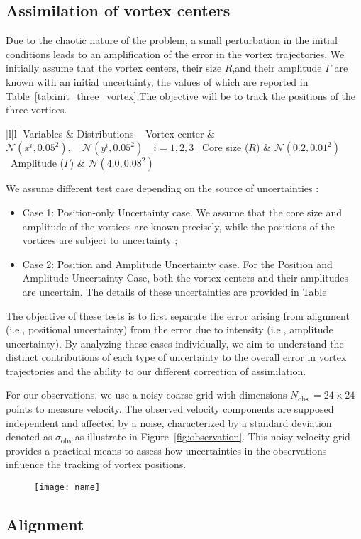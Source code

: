 \subsection*{Assimilation of vortex centers}

Due to the chaotic nature of the problem, a small perturbation in the initial conditions leads to an amplification of the error in the vortex trajectories.
We initially assume that the vortex centers, their size $R$,and their amplitude $\Gamma$ are known with an initial uncertainty, the values of which are reported in Table~\ref{tab:init_three_vortex}.The objective will be to track the positions of the three vortices.

\begin{table}[htbp]
    \centering
    \caption{Initial Conditions}
    \begin{tabular}[t]{|l|l|}
        \hline
        Variables            & Distributions \
        \hline
        Vortex center        & $\mathcal{N}(x^i,0.05^2), \quad \mathcal{N}(y^i,0.05^2) \quad i = {1,2,3}$ \
        Core size ($R$)      & $\mathcal{N}(0.2, 0.01^2)$ \
        Amplitude ($\Gamma$) & $\mathcal{N}(4.0, 0.08^2)$ \
        \hline
    \end{tabular}
    \label{tab:ref_three_vortex}
\end{table}

We assume different test case depending on the source of uncertainties :
\begin{itemize}
    \item Case 1: Position-only Uncertainty case. We assume that the core size and amplitude of the vortices are known precisely, while the positions of the vortices are subject to uncertainty ;\\
    \item Case 2: Position and Amplitude Uncertainty case. For the Position and Amplitude Uncertainty Case, both the vortex centers and their amplitudes are uncertain. The details of these uncertainties are provided in Table
\end{itemize}

The objective of these tests is to first separate the error arising from alignment (i.e., positional uncertainty) from the error due to intensity (i.e., amplitude uncertainty). By analyzing these cases individually, we aim to understand the distinct contributions of each type of uncertainty to the overall error in vortex trajectories and the ability to our different correction of assimilation.

For our observations, we use a noisy coarse grid with dimensions $N_{\text{obs.}} = 24\times 24$ points to measure velocity. The observed velocity components are supposed independent and affected by a noise, characterized by a standard deviation denoted as $\sigma_{\text{obs}}$ as illustrate in Figure~\ref{fig:observation}. This noisy velocity grid provides a practical means to assess how uncertainties in the observations influence the tracking of vortex positions.

\begin{figure}
    \centering
    \texttt{[image: name]}
\end{figure}
\subsection*{Alignment}


